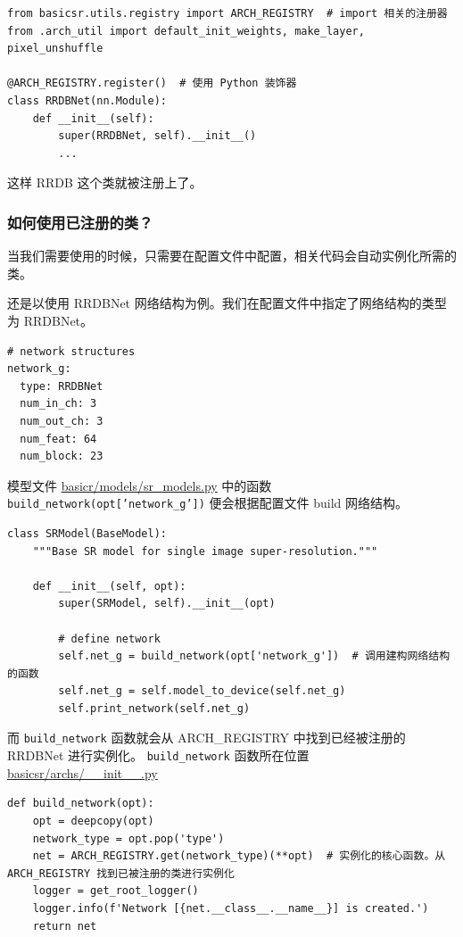 \documentclass[../main.tex]{subfiles}
\begin{document}
\begin{verbatim}
from basicsr.utils.registry import ARCH_REGISTRY  # import 相关的注册器
from .arch_util import default_init_weights, make_layer, pixel_unshuffle

@ARCH_REGISTRY.register()  # 使用 Python 装饰器
class RRDBNet(nn.Module):
    def __init__(self):
        super(RRDBNet, self).__init__()
        ...
\end{verbatim}

这样 RRDB 这个类就被注册上了。

\subsubsection{如何使用已注册的类？}\label{code_structure:how_to_use_registerd}

当我们需要使用的时候，只需要在配置文件中配置，相关代码会自动实例化所需的类。

还是以使用 RRDBNet 网络结构为例。我们在配置文件中指定了网络结构的类型为 RRDBNet。
\begin{verbatim}
# network structures
network_g:
  type: RRDBNet
  num_in_ch: 3
  num_out_ch: 3
  num_feat: 64
  num_block: 23
\end{verbatim}

模型文件 \href{https://github.com/XPixelGroup/BasicSR/blob/master/basicsr/models/sr_model.py}{basicr/models/sr\_models.py} 中的函数 \texttt{build\_network(opt['network\_g'])} 便会根据配置文件 build 网络结构。
\begin{verbatim}
class SRModel(BaseModel):
    """Base SR model for single image super-resolution."""

    def __init__(self, opt):
        super(SRModel, self).__init__(opt)

        # define network
        self.net_g = build_network(opt['network_g'])  # 调用建构网络结构的函数
        self.net_g = self.model_to_device(self.net_g)
        self.print_network(self.net_g)
\end{verbatim}

而 \texttt{build\_network} 函数就会从 ARCH\_REGISTRY 中找到已经被注册的 RRDBNet 进行实例化。 \texttt{build\_network} 函数所在位置 \href{https://github.com/XPixelGroup/BasicSR/blob/master/basicsr/archs/\_\_init\_\_.py}{basicsr/archs/\_\_init\_\_.py}

\begin{verbatim}
def build_network(opt):
    opt = deepcopy(opt)
    network_type = opt.pop('type')
    net = ARCH_REGISTRY.get(network_type)(**opt)  # 实例化的核心函数。从 ARCH_REGISTRY 找到已被注册的类进行实例化
    logger = get_root_logger()
    logger.info(f'Network [{net.__class__.__name__}] is created.')
    return net
\end{verbatim}
\end{document}
